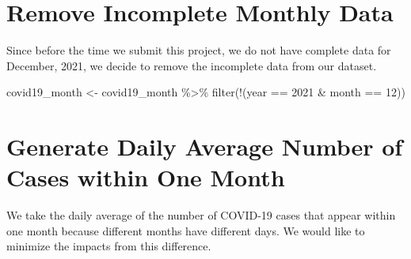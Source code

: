 \documentclass[
]{book}
\newenvironment{Shaded}{\begin{snugshade}}{\end{snugshade}}
\newcommand{\DecValTok}[1]{\textcolor[rgb]{0.00,0.00,0.81}{#1}}
\newcommand{\FunctionTok}[1]{\textcolor[rgb]{0.00,0.00,0.00}{#1}}
\newcommand{\NormalTok}[1]{#1}
\newcommand{\OtherTok}[1]{\textcolor[rgb]{0.56,0.35,0.01}{#1}}
\newcommand{\SpecialCharTok}[1]{\textcolor[rgb]{0.00,0.00,0.00}{#1}}
\begin{document}
\hypertarget{remove-incomplete-monthly-data}{%
\section{Remove Incomplete Monthly Data}\label{remove-incomplete-monthly-data}}

Since before the time we submit this project, we do not have complete data for December, 2021, we decide to remove the incomplete data from our dataset.

\begin{Shaded}
\begin{Highlighting}[]
\NormalTok{covid19\_month }\OtherTok{\textless{}{-}}\NormalTok{ covid19\_month }\SpecialCharTok{\%\textgreater{}\%}
  \FunctionTok{filter}\NormalTok{(}\SpecialCharTok{!}\NormalTok{(year }\SpecialCharTok{==} \DecValTok{2021} \SpecialCharTok{\&}\NormalTok{ month }\SpecialCharTok{==} \DecValTok{12}\NormalTok{)) }
\end{Highlighting}
\end{Shaded}

\hypertarget{generate-daily-average-number-of-cases-within-one-month}{%
\section{Generate Daily Average Number of Cases within One Month}\label{generate-daily-average-number-of-cases-within-one-month}}

We take the daily average of the number of COVID-19 cases that appear within one month because different months have different days. We would like to minimize the impacts from this difference.
\end{document}
